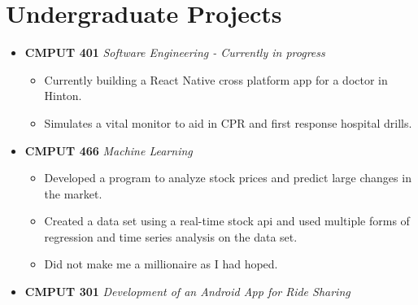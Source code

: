 \documentclass[11pt,a4paper,sans]{moderncv}        %
\begin{document}
\vspace{2pt}


\section{Undergraduate Projects}

\vspace{5pt}

\begin{itemize}
    \item{\textbf{CMPUT 401} \textit{Software Engineering - Currently in progress}
        \vspace{3pt}

        \begin{itemize}
            \item Currently building a React Native cross platform app for a doctor in Hinton.
            \item Simulates a vital monitor to aid in CPR and first response hospital drills.
        \end{itemize}
        \vspace{6pt}
    }

    \item{\textbf{CMPUT 466} \textit{Machine Learning}
        \vspace{3pt}

        \begin{itemize}
            \item Developed a program to analyze stock prices and predict large changes in the market.
            \item Created a data set using a real-time stock api and used multiple forms of regression and time series analysis on the data set.
            \item Did not make me a millionaire as I had hoped.
        \end{itemize}
        \vspace{6pt}
    }

\item{\textbf{CMPUT 301} \textit{Development of an Android App for Ride Sharing}
\vspace{3pt}

}
\end{itemize}
\end{document}
